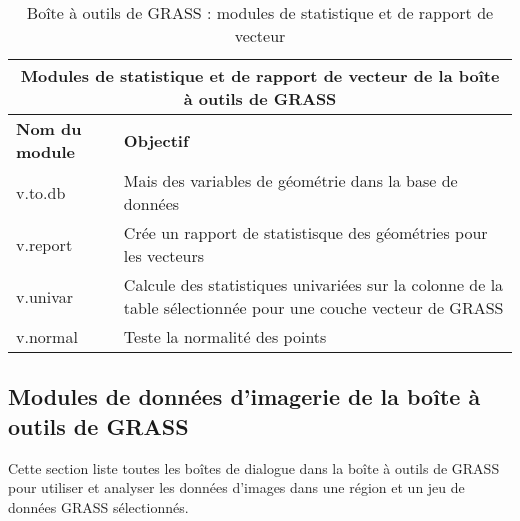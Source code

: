 \vspace{-0.5cm}

\begin{table}[H]
\centering
 \begin{tabular}{|p{3cm}|p{11cm}|}
  \hline \multicolumn{2}{|c|}{\textbf{Modules de statistique et de rapport de vecteur de la boîte à outils de GRASS}} \\
  \hline \textbf{Nom du module} & \textbf{Objectif} \\
  \hline v.to.db & Mais des variables de géométrie dans la base de données\\
  \hline v.report & Crée un rapport de statistisque des géométries pour les vecteurs\\
  \hline v.univar & Calcule des statistiques univariées sur la colonne de la table sélectionnée pour une couche vecteur de GRASS\\
  \hline v.normal & Teste la normalité des points\\
\hline
\end{tabular}
\caption{Boîte à outils de GRASS : modules de statistique et de rapport de vecteur}
\end{table}

\subsection{Modules de données d'imagerie de la boîte à outils de GRASS}

Cette section liste toutes les boîtes de dialogue dans la boîte à outils de GRASS pour utiliser et analyser les données d'images dans une région et un jeu de données GRASS sélectionnés.

